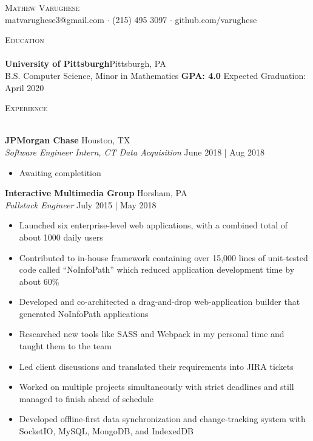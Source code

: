 \documentclass[a4paper]{article}
\newcommand{\lineunder} {
    \vspace*{-8pt} \\
    \hspace*{-18pt} \hrulefill \\
}
\newcommand{\header} [1] {
    {\hspace*{-18pt}\vspace*{6pt} \textsc{#1}}
    \vspace*{-6pt} \lineunder
}
\begin{document}
\vspace*{-40pt}

    

\vspace*{-10pt}
\begin{center}
	{\Huge \scshape {Mathew Varughese}}\\
	matvarughese3@gmail.com $\cdot$ (215) 495 3097 $\cdot$ github.com/varughese\\
\end{center}

\header{Education}
\textbf{University of Pittsburgh}\hfill Pittsburgh, PA\\
B.S. Computer Science, Minor in Mathematics \textbf{GPA: 4.0} \hfill  Expected Graduation: April 2020\\
\vspace{2mm}

\header{Experience}
\vspace{1mm}

\textbf{JPMorgan Chase} \hfill Houston, TX\\
\textit{Software Engineer Intern, CT Data Acquisition} \hfill June 2018 | Aug 2018\\
\vspace{-1mm}
\begin{itemize} \itemsep 1pt
	\item Awaiting completition
\end{itemize}
\textbf{Interactive Multimedia Group} \hfill Horsham, PA\\
\textit{Fullstack Engineer} \hfill July 2015 | May 2018\\
\vspace{-1mm}
\begin{itemize} \itemsep 1pt
	\item Launched six enterprise-level web applications, with a combined total of about 1000 daily users
	\item Contributed to in-house framework containing over 15,000 lines of unit-tested code called “NoInfoPath” which reduced application development time by about 60\%
	\item Developed and co-architected a drag-and-drop web-application builder that generated NoInfoPath applications
	\item Researched new tools like SASS and Webpack in my personal time and taught them to the team
	\item Led client discussions and translated their requirements into JIRA tickets
	\item Worked on multiple projects simultaneously with strict deadlines and still managed to finish ahead of schedule
	\item Developed offline-first data synchronization and change-tracking system with SocketIO, MySQL, MongoDB, and IndexedDB
\end{itemize}
\end{document}
